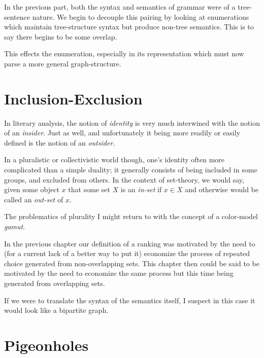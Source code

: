 \documentclass[twoside]{book}
\begin{document}
In the previous part, both the syntax and semantics of grammar were of a tree-sentence nature.
We begin to decouple this pairing by looking at enumerations which maintain tree-structure
syntax but produce non-tree semantics.  This is to say there begins to be some overlap.

This effects the enumeration, especially in its representation which must now parse a more general graph-structure.

\chapter{Inclusion-Exclusion}

In literary analysis, the notion of \emph{identity} is very much interwined with the notion of an \emph{insider}.
Just as well, and unfortunately it being more readily or easily defined is the notion of an \emph{outsider}.

In a pluralistic or collectivistic world though, one's identity often more complicated than a simple duality;
it generally consists of being included in some groups, and excluded from others.  In the context of set-theory,
we would say, given some object $ x $ that some set $ X $ is an \emph{in-set} if $ x\in X $ and otherwise would
be called an \emph{out-set} of $ x $.

The problematics of plurality I might return to with the concept of a color-model \emph{gamut}.

In the previous chapter our definition of a ranking was motivated by the need to (for a current lack of a better
way to put it) economize the process of repeated choice generated from non-overlapping sets.  This chapter then
could be said to be motivated by the need to economize the same process but this time being generated from
overlapping sets.

If we were to translate the syntax of the semantics itself, I suspect in this case it would look like a bipartite
graph.

\chapter{Pigeonholes}
\end{document}
